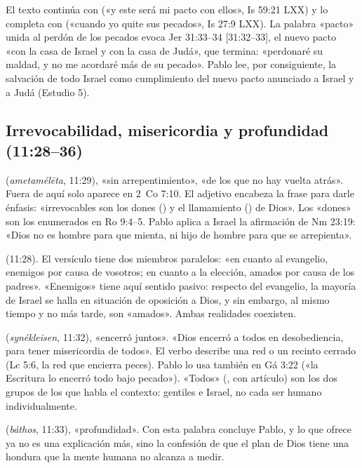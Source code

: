 El texto continúa con  («y este será mi pacto con ellos», Is 59:21 LXX) y lo completa con  («cuando yo quite sus pecados», Is 27:9 LXX). La palabra «pacto» unida al perdón de los pecados evoca Jer 31:33--34 [31:32--33], el nuevo pacto «con la casa de Israel y con la casa de Judá», que termina: «perdonaré su maldad, y no me acordaré más de su pecado». Pablo lee, por consiguiente, la salvación de todo Israel como cumplimiento del nuevo pacto anunciado a Israel y a Judá (Estudio 5).

\subsection{Irrevocabilidad, misericordia y profundidad (11:28--36)}

\textbf{} (\emph{ametamélēta}, 11:29), «sin arrepentimiento», «de los que no hay vuelta atrás». Fuera de aquí solo aparece en 2~Co 7:10. El adjetivo encabeza la frase para darle énfasis: «irrevocables son los dones () y el llamamiento () de Dios». Los «dones» son los enumerados en Ro 9:4--5. Pablo aplica a Israel la afirmación de Nm 23:19: «Dios no es hombre para que mienta, ni hijo de hombre para que se arrepienta».

\textbf{} (11:28). El versículo tiene dos miembros paralelos: «en cuanto al evangelio, enemigos por causa de vosotros; en cuanto a la elección, amados por causa de los padres». «Enemigos» tiene aquí sentido pasivo: respecto del evangelio, la mayoría de Israel se halla en situación de oposición a Dios, y sin embargo, al mismo tiempo y no más tarde, son «amados». Ambas realidades coexisten.

\textbf{} (\emph{synékleisen}, 11:32), «encerró juntos». «Dios encerró a todos en desobediencia, para tener misericordia de todos». El verbo describe una red o un recinto cerrado (Lc 5:6, la red que encierra peces). Pablo lo usa también en Gá 3:22 («la Escritura lo encerró todo bajo pecado»). «Todos» (, con artículo) son los dos grupos de los que habla el contexto: gentiles e Israel, no cada ser humano individualmente.

\textbf{} (\emph{báthos}, 11:33), «profundidad». Con esta palabra concluye Pablo, y lo que ofrece ya no es una explicación más, sino la confesión de que el plan de Dios tiene una hondura que la mente humana no alcanza a medir.

